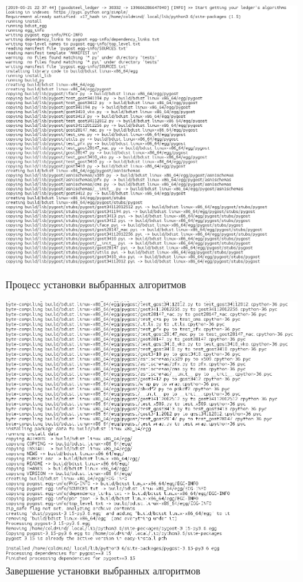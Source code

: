 \begin{figure}[h!]
    \centering
    \includegraphics[width=\textwidth]{./screenshots/installing1}
    \caption{Процесс установки выбранных алгоритмов}
    \label{inst1}
    \endminipage\hfill
    \includegraphics[width=\textwidth]{./screenshots/installing2}
    \caption{Завершение установки выбранных алгоритмов}
    \label{inst2}
    \endminipage{}
\end{figure}


